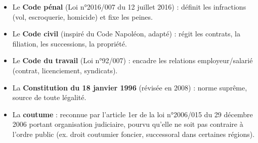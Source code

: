 \documentclass[11pt]{article}
\begin{document}
\begin{exemplebox}
\begin{itemize}
\item Le \textbf{Code pénal} (Loi n°2016/007 du 12 juillet 2016) : définit les infractions (vol, escroquerie, homicide) et fixe les peines.
\item Le \textbf{Code civil} (inspiré du Code Napoléon, adapté) : régit les contrats, la filiation, les successions, la propriété.
\item Le \textbf{Code du travail} (Loi n°92/007) : encadre les relations employeur/salarié (contrat, licenciement, syndicats).
\item La \textbf{Constitution du 18 janvier 1996} (révisée en 2008) : norme suprême, source de toute légalité.
\item La \textbf{coutume} : reconnue par l'article 1er de la loi n°2006/015 du 29 décembre 2006 portant organisation judiciaire, pourvu qu'elle ne soit pas contraire à l'ordre public (ex. droit coutumier foncier, successoral dans certaines régions).
\end{itemize}
\end{exemplebox}
\end{document}
